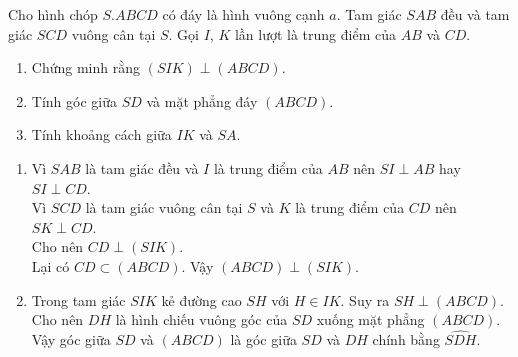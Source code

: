 \begin{bt}%
 Cho hình chóp $S.ABCD$ có đáy là hình vuông cạnh $a$. Tam giác $SAB$ đều và tam giác $SCD$ vuông cân tại $S$. Gọi $I$, $K$ lần lượt là trung điểm của $AB$ và $CD$.
 \begin{enumerate}
  \item Chứng minh rằng $(SIK) \perp (ABCD)$.
  \item Tính góc giữa $SD$ và mặt phẳng đáy $(ABCD)$.
  \item Tính khoảng cách giữa $IK$ và $SA$.
 \end{enumerate}
 \loigiai
 {
 \begin{center}
 \end{center}
 \begin{enumerate}
  \item Vì $SAB$ là tam giác đều và $I$ là trung điểm của $AB$ nên $SI \perp AB$ hay $SI \perp CD$.\\
  Vì $SCD$ là tam giác vuông cân tại $S$ và $K$ là trung điểm của $CD$ nên $SK \perp CD$.\\
  Cho nên $CD \perp (SIK)$.\\
  Lại có $CD \subset (ABCD)$.
  Vậy $(ABCD) \perp (SIK)$.
  \item Trong tam giác $SIK$ kẻ đường cao $SH$ với $H \in IK$. Suy ra $SH \perp (ABCD)$. Cho nên $DH$ là hình chiếu vuông góc của $SD$ xuống mặt phẳng $(ABCD)$.\\
  Vậy góc giữa $SD$ và $(ABCD)$ là góc giữa $SD$ và $DH$ chính bằng $\widehat{SDH}$.\\

\end{enumerate}}
\end{bt}

